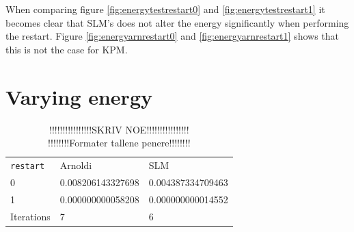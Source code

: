 When comparing figure \ref{fig:energytestrestart0} and \ref{fig:energytestrestart1} it becomes clear that SLM's does not alter the energy significantly when performing the restart. Figure \ref{fig:energyarnrestart0} and \ref{fig:energyarnrestart1} shows that this is not the case for KPM.\\


\section{Varying energy}


\begin{table}
\centering
\begin{tabular}{l l l}
\texttt{restart} & Arnoldi & SLM  \\
0 & 0.008206143327698 & 0.004387334709463 \\
1 & 0.000000000058208 & 0.000000000014552 \\
Iterations & 7 & 6 \\
\end{tabular}
\caption{!!!!!!!!!!!!!!!!SKRIV NOE!!!!!!!!!!!!!!!!\\!!!!!!!!Formater tallene penere!!!!!!!!}
\label{tab:SLMVE}
\end{table}


